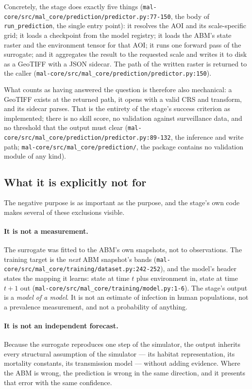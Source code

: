 \documentclass[11pt,a4paper]{article}
\newcommand{\code}[1]{\texttt{#1}}
\begin{document}
Concretely, the stage does exactly five things
(\code{mal-core/src/mal\_core/prediction/predictor.py:77-150}, the body of
\code{run\_prediction}, the single entry point): it resolves the AOI and its
scale-specific grid; it loads a checkpoint from the model registry; it loads
the ABM's state raster and the environment tensor for that AOI; it runs one
forward pass of the surrogate; and it aggregates the result to the requested
scale and writes it to disk as a GeoTIFF with a JSON sidecar. The path of the
written raster is returned to the caller
(\code{mal-core/src/mal\_core/prediction/predictor.py:150}).

What counts as having answered the question is therefore also mechanical: a
GeoTIFF exists at the returned path, it opens with a valid CRS and transform,
and its sidecar parses. That is the entirety of the stage's success
criterion as implemented; there is no skill score, no validation against
surveillance data, and no threshold that the output must clear
(\code{mal-core/src/mal\_core/prediction/predictor.py:89-132}, the inference
and write path; \code{mal-core/src/mal\_core/prediction/}, the package
contains no validation module of any kind).

\subsection{What it is explicitly not for}

The negative purpose is as important as the purpose, and the stage's own
code makes several of these exclusions visible.

\paragraph{It is not a measurement.}
The surrogate was fitted to the ABM's own snapshots, not to observations.
The training target is the \emph{next} ABM snapshot's bands
(\code{mal-core/src/mal\_core/training/dataset.py:242-252}), and the model's
header states the mapping it learns: state at time $t$ plus environment in,
state at time $t+1$ out
(\code{mal-core/src/mal\_core/training/model.py:1-6}). The stage's output is
a \emph{model of a model}. It is not an estimate of infection in human
populations, not a prevalence measurement, and not a probability of anything.

\paragraph{It is not an independent forecast.}
Because the surrogate reproduces one step of the simulator, the output
inherits every structural assumption of the simulator --- its habitat
representation, its mortality constants, its transmission model --- without
adding evidence. Where the ABM is wrong, the prediction is wrong in the same
direction, and it presents that error with the same confidence.
\end{document}
